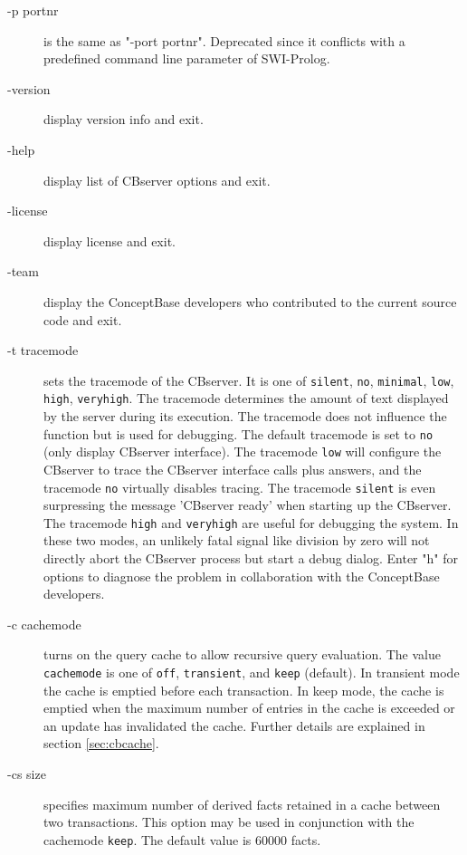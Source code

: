 \begin{description}
\item[-p portnr] is the same as "-port portnr". Deprecated since it conflicts with
a predefined command line parameter of SWI-Prolog.


\item[-version] display version info and exit.

\item[-help] display list of CBserver options and exit.

\item[-license] display license and exit.

\item[-team] display the ConceptBase developers who contributed to the current source code and exit.

\item[-t tracemode] sets the tracemode of the CBserver.
It is one of {\tt silent}, {\tt no}, {\tt minimal}, {\tt low}, {\tt high}, {\tt veryhigh}. The tracemode
determines the amount of text displayed by the server during its execution.
The tracemode does not influence the function but is used for debugging. The
default tracemode is set to {\tt no} (only display CBserver interface).
The tracemode {\tt low} will configure the CBserver to trace the CBserver interface
calls plus answers, and the tracemode {\tt no} virtually disables tracing.
The tracemode {\tt silent} is even surpressing the message 'CBserver ready' when starting up
the CBserver.
The tracemode {\tt high} and {\tt veryhigh} are useful for debugging the system.
In these two modes, an unlikely fatal signal like division by zero will not directly abort the
CBserver process but start a debug dialog. Enter "h" for options to
diagnose the problem in collaboration with the ConceptBase developers.

\item[-c cachemode] turns on the query cache to allow recursive query evaluation.
The value {\tt cachemode} is one of {\tt off}, {\tt transient}, and {\tt keep} (default).
In transient mode the cache is emptied before each transaction. In keep mode,
the cache is emptied when the maximum number of entries in the cache is exceeded
or an update has invalidated the cache. Further details are explained in section \ref{sec:cbcache}.

\item[-cs size] specifies maximum number of derived facts retained in a cache between two transactions.
This option may be used in conjunction with the cachemode  {\tt keep}. The default value is
60000 facts.


\end{description}
